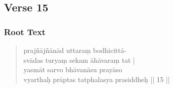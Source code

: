 \documentclass[12pt]{article}
\begin{document}
% 

\subsection{Verse 15}
\subsubsection{Root Text}
\begin{quote}
	prajñājñānād uttaraṃ bodhicittā-\\
	svādas turyaṃ sekam\footnoteB{
		sekam] \EDD ; seṣam \MS
	} āhāvaraṃ tat |\\
	yasmāt\footnoteB{
		yasmāt] \EDD ; paścāt \MS
	} sarvo bhāvanāsu prayāso \\
	vyarthaḥ prāptas tatphalasya prasiddheḥ || 15 ||

% 
\end{quote}
\end{document}
